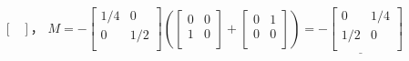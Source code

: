\documentclass{jsarticle}
\begin{document}
\begin{enumerate}[(a)]
\begin{math}
\begin{bmatrix}
      \end{bmatrix}        
  \end{math}，
  \begin{math}
    M= -
    \begin{bmatrix}
      1/4 & 0 \\
      0 & 1/2 \\
    \end{bmatrix}
    \left(
      \begin{bmatrix}
        0 & 0 \\
        1 & 0 \\
      \end{bmatrix}
      +
      \begin{bmatrix}
        0 & 1 \\
        0 & 0 \\
      \end{bmatrix}
    \right)
    = \underline{-
    \begin{bmatrix}
      0 & 1/4 \\
      1/2 & 0 \\
    \end{bmatrix} 
    }
  \end{math}


\end{enumerate}
\end{document}
